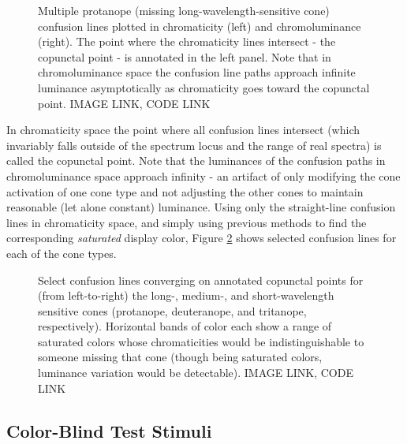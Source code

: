 \documentclass{article}
\newif\ifinvert
\begin{document}
\begin{figure} %
    \ifinvert
        
    \else
        
    \fi
    \caption{Multiple protanope (missing long-wavelength-sensitive cone) confusion lines plotted in chromaticity (left) and chromoluminance (right).  The point where the chromaticity lines intersect - the copunctal point - is annotated in the left panel.  Note that in chromoluminance space the confusion line paths approach infinite luminance asymptotically as chromaticity goes toward the copunctal point.  IMAGE LINK, CODE LINK}\label{fig:multiple_protan}
\end{figure}

In chromaticity space the point where all confusion lines intersect (which invariably falls outside of the spectrum locus and the range of real spectra) is called the copunctal point.  Note that the luminances of the confusion paths in chromoluminance space approach infinity - an artifact of only modifying the cone activation of one cone type and not adjusting the other cones to maintain reasonable (let alone constant) luminance.  Using only the straight-line confusion lines in chromaticity space, and simply using previous methods to find the corresponding \textit{saturated} display color, Figure \ref{fig:copunctal_points} shows selected confusion lines for each of the cone types.

\begin{figure} %
    \ifinvert
        
    \else
        
    \fi
    \caption{Select confusion lines converging on annotated copunctal points for (from left-to-right) the long-, medium-, and short-wavelength sensitive cones (protanope, deuteranope, and tritanope, respectively).  Horizontal bands of color each show a range of saturated colors whose chromaticities would be indistinguishable to someone missing that cone (though being saturated colors, luminance variation would be detectable).  IMAGE LINK, CODE LINK}\label{fig:copunctal_points}
\end{figure}

\subsection{Color-Blind Test Stimuli} %
\end{document}
